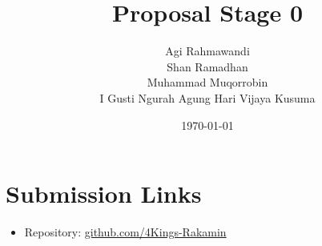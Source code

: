 \documentclass[12pt]{article}
\title{Proposal Stage 0}
\author{
    Agi Rahmawandi \\
    Shan Ramadhan \\
    Muhammad Muqorrobin \\
    I Gusti Ngurah Agung Hari Vijaya Kusuma
}\date{\today}
\begin{document}
\maketitle

\section*{Submission Links}
\begin{itemize}
  \item Repository: \href{https://github.com/4Kings-Rakamin}{github.com/4Kings-Rakamin}
\end{itemize}




\clearpage                 

\printbibliography[title={Daftar Pustaka}]
\end{document}
